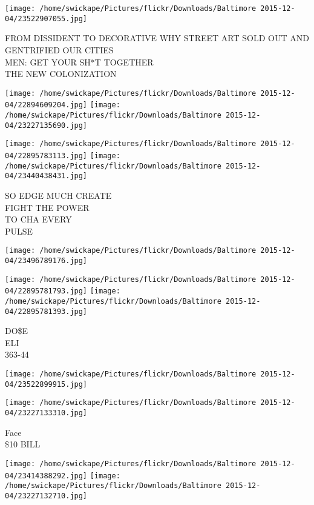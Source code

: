 \documentclass[10pt,letterpaper]{article}
\begin{document}
\vspace{0.25in}
\texttt{[image: /home/swickape/Pictures/flickr/Downloads/Baltimore 2015-12-04/23522907055.jpg]}

FROM DISSIDENT TO DECORATIVE WHY STREET ART SOLD OUT AND GENTRIFIED OUR CITIES\\
MEN: GET YOUR SH*T TOGETHER\\
THE NEW COLONIZATION
\pagebreak

\texttt{[image: /home/swickape/Pictures/flickr/Downloads/Baltimore 2015-12-04/22894609204.jpg]}
\texttt{[image: /home/swickape/Pictures/flickr/Downloads/Baltimore 2015-12-04/23227135690.jpg]}

\texttt{[image: /home/swickape/Pictures/flickr/Downloads/Baltimore 2015-12-04/22895783113.jpg]}
\texttt{[image: /home/swickape/Pictures/flickr/Downloads/Baltimore 2015-12-04/23440438431.jpg]}

SO EDGE MUCH CREATE\\
FIGHT THE POWER\\
TO CHA EVERY\\
PULSE
\pagebreak

\texttt{[image: /home/swickape/Pictures/flickr/Downloads/Baltimore 2015-12-04/23496789176.jpg]}

\vspace{0.25in}
\texttt{[image: /home/swickape/Pictures/flickr/Downloads/Baltimore 2015-12-04/22895781793.jpg]}
\texttt{[image: /home/swickape/Pictures/flickr/Downloads/Baltimore 2015-12-04/22895781393.jpg]}

DO\$E\\
ELI\\
363{-}44
\pagebreak

\texttt{[image: /home/swickape/Pictures/flickr/Downloads/Baltimore 2015-12-04/23522899915.jpg]}

\vspace{0.25in}
\texttt{[image: /home/swickape/Pictures/flickr/Downloads/Baltimore 2015-12-04/23227133310.jpg]}

Face\\
\$10 BILL
\pagebreak

\texttt{[image: /home/swickape/Pictures/flickr/Downloads/Baltimore 2015-12-04/23414388292.jpg]}
\texttt{[image: /home/swickape/Pictures/flickr/Downloads/Baltimore 2015-12-04/23227132710.jpg]}
\end{document}
